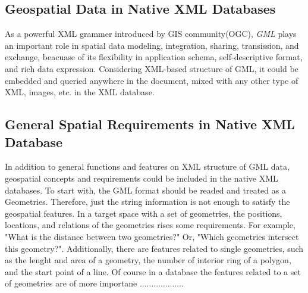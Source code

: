 \documentclass[a4paper,12pt]{article}
\begin{document}
\subsection{Geospatial Data in Native XML Databases}
As a powerful XML grammer introduced by GIS community(OGC), \textit{GML} plays an important role in spatial data modeling, integration, sharing, transission, and exchange, beacuase of its flexibility in application schema, self-descriptive format, and rich data expression. Considering XML-based structure of GML, it could be embedded and queried anywhere in the document, mixed with any other type of XML, images, etc. in the XML database. 

\subsection{General Spatial Requirements in Native XML Database}
In addition to general functions and features on XML structure of GML data, geospatial concepts and requirements could be included in the native XML databases. To start with, the GML format should be readed and treated as a Geometries. Therefore, just the string information is not enough to satisfy the geospatial features. In a target space with a set of geometries, the positions, locations, and relations of the geometries rises some requirements. For example, "What is the distance between two geometries?" Or, "Which geometries intersect this geometry?". Additionally, there are features related to single geometries, such as the lenght and area of a geometry, the number of interior ring of a polygon, and the start point of a line. Of course in a database the features related to a set of geometries are of more importane ...................

\end{document}
